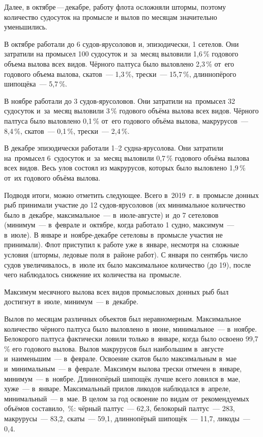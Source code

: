 Далее, в октябре\,---\,декабре, работу флота осложняли штормы, поэтому количество судосуток на промысле и вылов по месяцам значительно уменьшились.

В октябре работали до 6 судов-ярусоловов и, эпизодически, 1 сетелов. Они затратили на промысел 100 судосуток и~за~месяц выловили 1,6\,\% годового объема вылова всех видов. Чёрного палтуса было выловлено 2,3\,\% от~его годового объема вылова, скатов~--- 1,3\,\%, трески~--- 15,7\,\%, длиннопёрого шипощёка~--- 5,7\,\%.

В ноябре работали до 3 судов-ярусоловов. Они затратили на~промысел 32 судосуток и~за~месяц выловили 3\,\% годового объёма вылова всех видов. Чёрного палтуса было выловлено 0,1\,\% от~его годового объёма вылова, макрурусов~--- 8,4\,\%, скатов~--- 0,1\,\%, трески~--- 2,4\,\%.

В декабре эпизодически работали 1--2 судна-ярусолова. Они затратили на~промысел 6~судосуток и~за~месяц выловили 0,7\,\% годового объёма вылова всех видов. Весь улов состоял из макрурусов, которых было выловлено 1,9\,\% от~их годового объёма вылова.

Подводя итоги, можно отметить следующее. Всего в~2019~г. в~промысле донных рыб принимали участие до 12 судов-ярусоловов (их минимальное количество было в~декабре, максимальное~--- в~июле-августе) и~до 7 сетеловов (минимум~--- в~феврале и~октябре, когда работало 1 судно, максимум~--- в~июле). В январе и~ноябре-декабре сетеловы в~промысле участия не принимали). Флот приступил к работе уже в~январе, несмотря на~сложные условия (штормы, ледовые поля в~районе работ). С января по сентябрь число судов увеличивалось, в~июле их было максимальное количество (до 19), после чего наблюдалось снижение их количества на~промысле.

Максимум месячного вылова всех видов промысловых донных рыб был достигнут в~июле, минимум~--- в~декабре.

Вылов по месяцам различных объектов был неравномерным. Максимальное количество чёрного палтуса было выловлено в~июне, минимальное~--- в~ноябре. Белокорого палтуса фактически ловили только в~январе, когда было освоено 99,7\,\% его годового вылова. Вылов макрурусов был наибольшим в~августе и~наименьшим~--- в~феврале. Освоение скатов было максимальным в~мае и~минимальным~--- в~феврале. Максимум вылова трески отмечен в~январе, минимум~--- в~ноябре. Длиннопёрый шипощёк лучше всего ловился в~мае, хуже~--- в~январе. Максимальный прилов ликодов наблюдался в~апреле, минимальный~--- в~мае.
\clearpage
В целом за год освоение по видам от~рекомендуемых объёмов составило,~\%: чёрный палтус~--- 62,3, белокорый палтус~--- 283, макрурусы~--- 83,2, скаты~--- 59,1, длиннопёрый шипощёк~--- 11,7, ликоды~--- 0,4.

